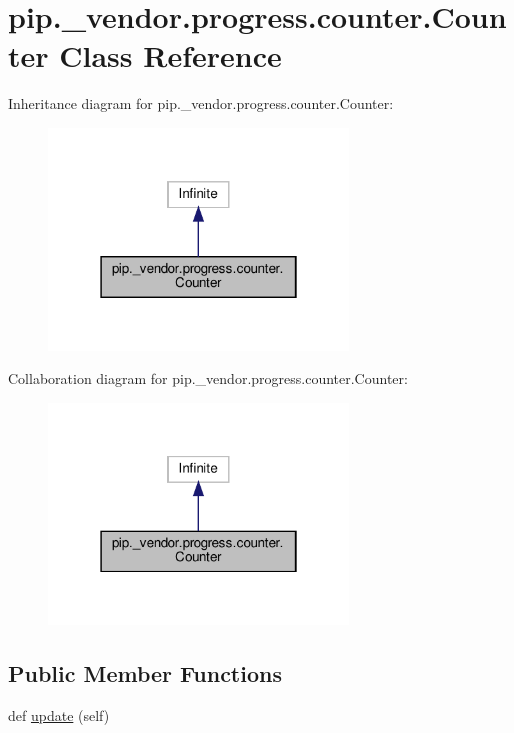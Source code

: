 \hypertarget{classpip_1_1__vendor_1_1progress_1_1counter_1_1Counter}{}\section{pip.\+\_\+vendor.\+progress.\+counter.\+Counter Class Reference}
\label{classpip_1_1__vendor_1_1progress_1_1counter_1_1Counter}


Inheritance diagram for pip.\+\_\+vendor.\+progress.\+counter.\+Counter\+:
\nopagebreak
\begin{figure}[H]
\begin{center}
\leavevmode
\includegraphics[width=226pt]{classpip_1_1__vendor_1_1progress_1_1counter_1_1Counter__inherit__graph}
\end{center}
\end{figure}


Collaboration diagram for pip.\+\_\+vendor.\+progress.\+counter.\+Counter\+:
\nopagebreak
\begin{figure}[H]
\begin{center}
\leavevmode
\includegraphics[width=226pt]{classpip_1_1__vendor_1_1progress_1_1counter_1_1Counter__coll__graph}
\end{center}
\end{figure}
\subsection*{Public Member Functions}
\begin{DoxyCompactItemize}
\item 
def \hyperlink{classpip_1_1__vendor_1_1progress_1_1counter_1_1Counter_a66bd8824561e1565e96015dbddb60366}{update} (self)
\end{DoxyCompactItemize}


